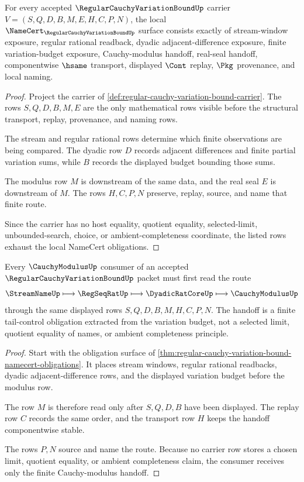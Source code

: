 \begin{theorem}
\label{thm:regular-cauchy-variation-bound-namecert-obligations}
For every accepted $\RegularCauchyVariationBoundUp$ carrier $V=(S,Q,D,B,M,E,H,C,P,N)$, the local $\NameCert_{\RegularCauchyVariationBoundUp}$ surface consists exactly of stream-window exposure, regular rational readback, dyadic adjacent-difference exposure, finite variation-budget exposure, Cauchy-modulus handoff, real-seal handoff, componentwise $\hsame$ transport, displayed $\Cont$ replay, $\Pkg$ provenance, and local naming.
\end{theorem}
\begin{proof}
Project the carrier of \autoref{def:regular-cauchy-variation-bound-carrier}. The rows $S,Q,D,B,M,E$ are the only mathematical rows visible before the structural transport, replay, provenance, and naming rows.

The stream and regular rational rows determine which finite observations are being compared. The dyadic row $D$ records adjacent differences and finite partial variation sums, while $B$ records the displayed budget bounding those sums.

The modulus row $M$ is downstream of the same data, and the real seal $E$ is downstream of $M$. The rows $H,C,P,N$ preserve, replay, source, and name that finite route.

Since the carrier has no host equality, quotient equality, selected-limit, unbounded-search, choice, or ambient-completeness coordinate, the listed rows exhaust the local NameCert obligations.
\end{proof}

\begin{theorem}
\label{thm:regular-cauchy-variation-bound-cauchy-handoff}
Every $\CauchyModulusUp$ consumer of an accepted $\RegularCauchyVariationBoundUp$ packet must first read the route
$$
\StreamNameUp \longmapsto \RegSeqRatUp \longmapsto \DyadicRatCoreUp \longmapsto \CauchyModulusUp
$$
through the same displayed rows $S,Q,D,B,M,H,C,P,N$. The handoff is a finite tail-control obligation extracted from the variation budget, not a selected limit, quotient equality of names, or ambient completeness principle.
\end{theorem}
\begin{proof}
Start with the obligation surface of \autoref{thm:regular-cauchy-variation-bound-namecert-obligations}. It places stream windows, regular rational readbacks, dyadic adjacent-difference rows, and the displayed variation budget before the modulus row.

The row $M$ is therefore read only after $S,Q,D,B$ have been displayed. The replay row $C$ records the same order, and the transport row $H$ keeps the handoff componentwise stable.

The rows $P,N$ source and name the route. Because no carrier row stores a chosen limit, quotient equality, or ambient completeness claim, the consumer receives only the finite Cauchy-modulus handoff.
\end{proof}


